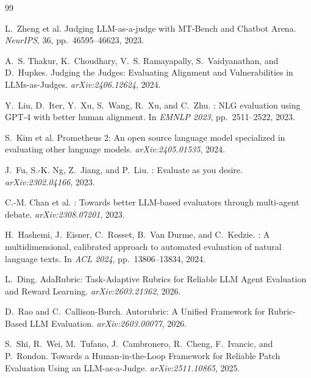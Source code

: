 \documentclass[11pt]{article}
\begin{document}

\begin{thebibliography}{99}
\setlength{\itemsep}{2pt}
\setlength{\parsep}{0pt}

L.~Zheng et al.
\newblock Judging {LLM}-as-a-judge with {MT}-{B}ench and {C}hatbot {A}rena.
\newblock \emph{NeurIPS}, 36, pp.\ 46595--46623, 2023.

A.~S. Thakur, K.~Choudhary, V.~S. Ramayapally, S.~Vaidyanathan, and D.~Hupkes.
\newblock Judging the Judges: Evaluating Alignment and Vulnerabilities in
{LLM}s-as-Judges.
\newblock \emph{arXiv:2406.12624}, 2024.

Y.~Liu, D.~Iter, Y.~Xu, S.~Wang, R.~Xu, and C.~Zhu.
: {NLG} evaluation using {GPT-4} with better human
alignment.
\newblock In \emph{EMNLP 2023}, pp.\ 2511--2522, 2023.

S.~Kim et al.
\newblock Prometheus 2: An open source language model specialized in
evaluating other language models.
\newblock \emph{arXiv:2405.01535}, 2024.

J.~Fu, S.-K. Ng, Z.~Jiang, and P.~Liu.
: Evaluate as you desire.
\newblock \emph{arXiv:2302.04166}, 2023.

C.-M. Chan et al.
: Towards better {LLM}-based evaluators through
multi-agent debate.
\newblock \emph{arXiv:2308.07201}, 2023.

H.~Hashemi, J.~Eisner, C.~Rosset, B.~Van Durme, and C.~Kedzie.
: A multidimensional, calibrated approach to automated
evaluation of natural language texts.
\newblock In \emph{ACL 2024}, pp.\ 13806--13834, 2024.

L.~Ding.
\newblock AdaRubric: Task-Adaptive Rubrics for Reliable {LLM} Agent Evaluation and Reward Learning.
\newblock \emph{arXiv:2603.21362}, 2026.

D.~Rao and C.~Callison-Burch.
\newblock Autorubric: A Unified Framework for Rubric-Based {LLM} Evaluation.
\newblock \emph{arXiv:2603.00077}, 2026.

S.~Shi, R.~Wei, M.~Tufano, J.~Cambronero, R.~Cheng, F.~Ivancic, and P.~Rondon.
\newblock Towards a Human-in-the-Loop Framework for Reliable Patch Evaluation
Using an {LLM}-as-a-Judge.
\newblock \emph{arXiv:2511.10865}, 2025.


\end{thebibliography}
\end{document}
